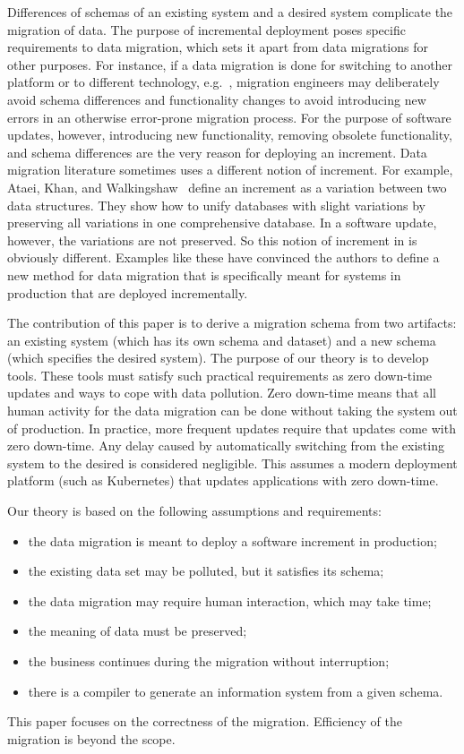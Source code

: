 \documentclass{elsarticle}
\begin{document}
   Differences of schemas of an existing system and a desired system complicate the migration of data.
   The purpose of incremental deployment poses specific requirements to data migration,
   which sets it apart from data migrations for other purposes.
   For instance, if a data migration is done for switching to another platform or to different technology,
   e.g.~\cite{Gholami2016,Bisbal1999},
   migration engineers may deliberately avoid schema differences and functionality changes to avoid introducing new errors in an otherwise error-prone migration process.
   For the purpose of software updates, however, introducing new functionality, removing obsolete functionality, and schema differences are the very reason for deploying an increment.
   Data migration literature sometimes uses a different notion of increment.
   For example, Ataei, Khan, and Walkingshaw~\cite{Ataei2021,Walkingshaw2014} define an increment as a variation between two data structures.
   They show how to unify databases with slight variations by preserving all variations in one comprehensive database.
   In a software update, however, the variations are not preserved.
   So this notion of increment in\cite{Ataei2021} is obviously different.
   Examples like these have convinced the authors to define a new method for data migration that is specifically meant for systems in production that are
   deployed incrementally.
   
   The contribution of this paper is to derive a migration schema from two artifacts: an existing system
   (which has its own schema and dataset) and a new schema (which specifies the desired system).
   The purpose of our theory is to develop tools.
   These tools must satisfy such practical requirements as
   zero down-time updates and ways to cope with data pollution.
   Zero down-time means that all human activity for the data migration can be done without taking the system out of production.
   In practice, more frequent updates require that updates come with zero down-time.
   Any delay caused by automatically switching from the existing system to the desired is considered negligible.
   This assumes a modern deployment platform (such as Kubernetes) that updates applications with zero down-time.
   
   Our theory is based on the following assumptions and requirements:
\begin{itemize}
   \item the data migration is meant to deploy a software increment in production;
   \item the existing data set may be polluted, but it satisfies its schema;
   \item the data migration may require human interaction, which may take time;
   \item the meaning of data must be preserved;
   \item the business continues during the migration without interruption;
   \item there is a compiler to generate an information system from a given schema.
\end{itemize}
   This paper focuses on the correctness of the migration.
   Efficiency of the migration is beyond the scope.
\end{document}
